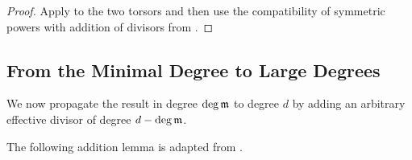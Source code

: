 \begin{proof}
Apply  to the two torsors and then
use the compatibility of symmetric powers with addition of divisors from
.
\end{proof}

\subsection{From the Minimal Degree to Large Degrees}

We now propagate the result in degree $\deg\mathfrak{m}$ to degree $d$ by adding
an arbitrary effective divisor of degree $d-\deg\mathfrak{m}$.

The following addition lemma is adapted from \cite[Lemma~4.1]{takeuchi2019blow}.

